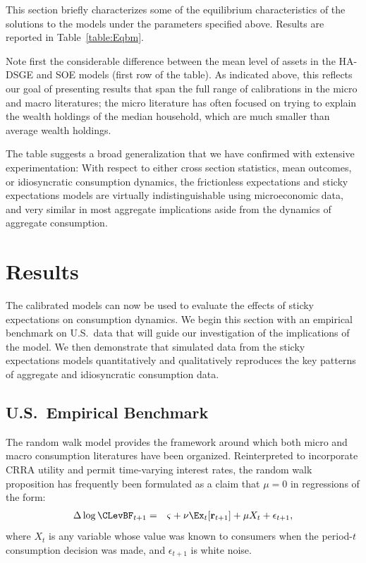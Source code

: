 \documentclass[titlepage]{\econtex}\newcommand{\texname}{cAndCwithStickyE}
\begin{document}
This section briefly characterizes some of the equilibrium characteristics of the solutions to the models under the parameters specified above.  Results are reported in Table~\ref{table:Eqbm}.

Note first the considerable difference between the mean level of assets in the HA-DSGE and SOE models (first row of the table).  As indicated above, this reflects our goal of presenting results that span the full range of calibrations in the micro and macro literatures; the micro literature has often focused on trying to explain the wealth holdings of the median household, which are much smaller than average wealth holdings.

The table suggests a broad generalization that we have confirmed with extensive experimentation: With respect to either cross section statistics, mean outcomes, or idiosyncratic consumption dynamics, the frictionless expectations and sticky expectations models are virtually indistinguishable using microeconomic data, and very similar in most aggregate implications aside from the dynamics of aggregate consumption.





\section{Results}\label{sec:Results}

The calibrated models can now be used to evaluate the effects of sticky expectations on consumption dynamics.  We begin this section with an empirical benchmark on U.S.\ data that will guide our investigation of the implications of the model.  We then demonstrate that simulated data from the sticky expectations models quantitatively and qualitatively reproduces the key patterns of aggregate and idiosyncratic consumption data.

\subsection{U.S.\ Empirical Benchmark}
\label{sec:EmpBenchmark}

The random walk model provides the framework around which both micro and macro consumption literatures have been organized.  Reinterpreted to incorporate CRRA utility and permit time-varying interest rates, the random walk proposition has frequently been formulated as a claim that $\mu=0$ in regressions of the form:
\begin{eqnarray}
  \label{eq:RandomWalkCRRA}
  \Delta \log \CLevBF_{t+1} & = & \varsigma+\nu \Ex_{t}[\mathbf{r}_{t+1}]+\mu X_{t}+\epsilon_{t+1},
\end{eqnarray}
where $X_{t}$ is any variable whose value was known to consumers
when the period-$t$ consumption decision was made, and $\epsilon_{t+1}$
is white noise.
\end{document}
